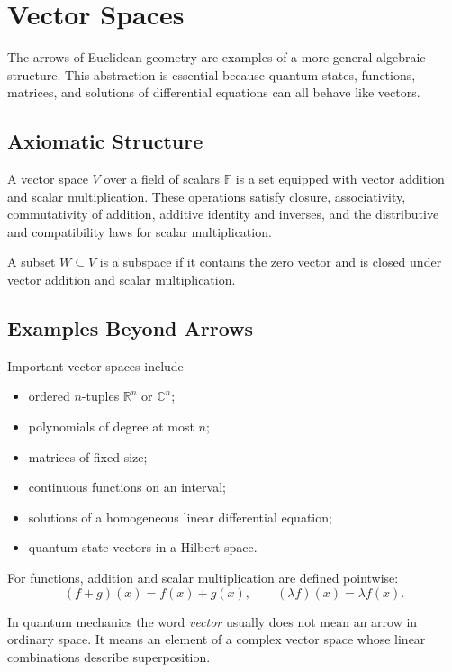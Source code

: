 \section{Vector Spaces}
\label{sec:vector-spaces}

The arrows of Euclidean geometry are examples of a more general algebraic structure. This abstraction is essential because quantum states, functions, matrices, and solutions of differential equations can all behave like vectors.

\subsection{Axiomatic Structure}

A vector space $V$ over a field of scalars $\mathbb F$ is a set equipped with vector addition and scalar multiplication. These operations satisfy closure, associativity, commutativity of addition, additive identity and inverses, and the distributive and compatibility laws for scalar multiplication.

\begin{definition}
A subset $W\subseteq V$ is a subspace if it contains the zero vector and is closed under vector addition and scalar multiplication.
\end{definition}

\subsection{Examples Beyond Arrows}

Important vector spaces include
\begin{itemize}
\item ordered $n$-tuples $\mathbb R^n$ or $\mathbb C^n$;
\item polynomials of degree at most $n$;
\item matrices of fixed size;
\item continuous functions on an interval;
\item solutions of a homogeneous linear differential equation;
\item quantum state vectors in a Hilbert space.
\end{itemize}

For functions, addition and scalar multiplication are defined pointwise:
\[
(f+g)(x)=f(x)+g(x),
\qquad
(\lambda f)(x)=\lambda f(x).
\]

\begin{physical}
In quantum mechanics the word \emph{vector} usually does not mean an arrow in ordinary space. It means an element of a complex vector space whose linear combinations describe superposition.
\end{physical}

